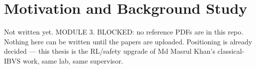 \chapter{Motivation and Background Study}\label{ch:background}

\begin{draftnote}
Not written yet. MODULE 3. BLOCKED: no reference PDFs are in this repo. Nothing here can be written until the papers are uploaded. Positioning is already decided --- this thesis is the RL/safety upgrade of Md Masrul Khan's classical-IBVS work, same lab, same supervisor.
\end{draftnote}

